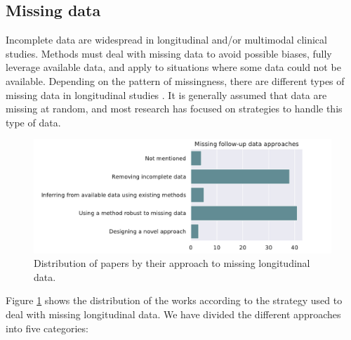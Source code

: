 \subsection{Missing data}

Incomplete data are widespread in longitudinal and/or multimodal clinical studies. Methods must deal with missing data to avoid possible biases, fully leverage available data, and apply to situations where some data could not be available. Depending on the pattern of missingness, there are different types of missing data in longitudinal studies \cite{Liu2015b}. It is generally assumed that data are missing at random, and most research has focused on strategies to handle this type of data.  \\

\begin{figure}[!htbp]
     \centering
     \includegraphics[width=1.0\textwidth]{figures/review/Fig7.pdf}
     \caption{Distribution of papers by their approach to missing longitudinal data.}
     \label{fig:missingfoll}

\end{figure}

Figure \ref{fig:missingfoll} shows the distribution of the works according to the strategy used to deal with missing longitudinal data. We have divided the different approaches into five categories: \\

